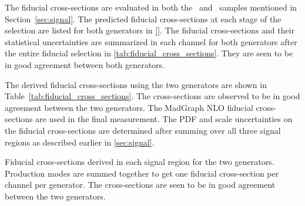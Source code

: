 The fiducial cross-sections are evaluated in both 
the \vbfnlo~and \madgraph~samples mentioned in Section~\ref{sec:signal}.
The predicted fiducial cross-sections at each stage of the selection
are listed for both generators in \tab\ref{}.
The fiducial cross-sections and their
statistical uncertainties 
are summarized in each channel for both generators 
after the entire fiducial selection
in \tab\ref{tab:fiducial_cross_sections}.
They are seen to be in good agreement between both generators.


The derived fiducial cross-sections using the two generators are 
shown in Table~\ref{tab:fiducial_cross_sections}.  The cross-sections are observed
to be in good agreement between the two generators. The MadGraph NLO
fiducial cross-sections are used in the final measurement.
The PDF and scale uncertainties on the fiducial cross-sections
are determined after summing over all three signal regions 
as described earlier in \sec\ref{sec:signal}.





\begin{table}[ht!]
\centering
\begin{footnotesize}

\end{footnotesize}
\caption{Fiducial cross-sections derived in each signal region for the two 
generators. Production modes are summed together to get one fiducial 
cross-section per channel per generator. The cross-sections are seen to 
be in good agreement between the two generators.}
\label{tab:fiducial_cross_sections}
\end{table}
